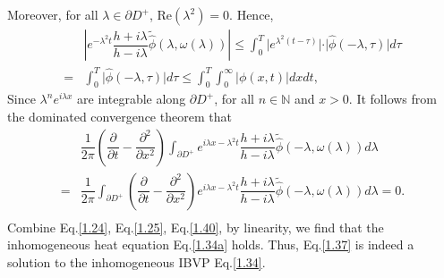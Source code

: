 \documentclass[12pt]{article}
\numberwithin{equation}{section}
\begin{document}
Moreover, for all $\lambda\in\partial D^+$, $\text{Re}(\lambda^2)=0$. Hence,
\begin{equation*}
    \begin{split}
        &\left|e^{-\lambda^2 t}\dfrac{h+i\lambda}{h-i\lambda}\tilde{\hat{\phi}}(\lambda,\omega(\lambda))\right|\leqslant \int_{0}^{T}\vert e^{\lambda^2(t-\tau)}\vert\cdot\vert\hat{\phi}(-\lambda,\tau)\vert d\tau\\
        =&\int_{0}^{T}\vert\hat{\phi}(-\lambda,\tau)\vert d\tau\leqslant \int_{0}^{T}\int_{0}^{\infty}\vert \phi(x,t)\vert dxdt,
    \end{split}
\end{equation*}
Since $\lambda^n e^{i\lambda x}$ are integrable along $\partial D^+$, for all $n\in\mathbb{N}$ and $x>0$. It follows from the dominated convergence theorem that
\begin{equation}\label{1.40}
    \begin{split}
        &\dfrac{1}{2\pi}\left(\dfrac{\partial}{\partial t}-\dfrac{\partial^2}{\partial x^2}\right)\int_{\partial D^+} e^{i\lambda x-\lambda^2 t}\dfrac{h+i\lambda}{h-i\lambda}\tilde{\hat{\phi}}(-\lambda,\omega(\lambda))d\lambda\\
        =&\dfrac{1}{2\pi}\int_{\partial D^+} \left(\dfrac{\partial}{\partial t}-\dfrac{\partial^2}{\partial x^2}\right)e^{i\lambda x-\lambda^2 t}\dfrac{h+i\lambda}{h-i\lambda}\tilde{\hat{\phi}}(-\lambda,\omega(\lambda))d\lambda=0.\\
    \end{split}
\end{equation}
Combine Eq.\eqref{1.24}, Eq.\eqref{1.25}, Eq.\eqref{1.40}, by linearity, we find that the inhomogeneous heat equation Eq.\eqref{1.34a} holds.
Thus, Eq.\eqref{1.37} is indeed a solution to the inhomogeneous IBVP Eq.\eqref{1.34}.
\end{document}
